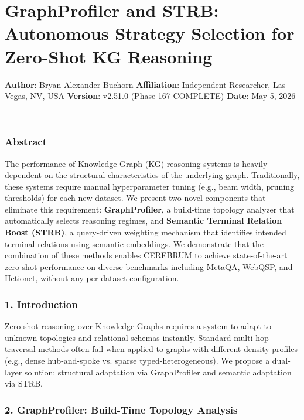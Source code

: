 \section{GraphProfiler and STRB: Autonomous Strategy Selection for Zero-Shot KG Reasoning}

\textbf{Author}: Bryan Alexander Buchorn  
\textbf{Affiliation}: Independent Researcher, Las Vegas, NV, USA  
\textbf{Version}: v2.51.0 (Phase 167 COMPLETE)
\textbf{Date}: May 5, 2026

---

\subsubsection{Abstract}

The performance of Knowledge Graph (KG) reasoning systems is heavily dependent on the structural chara\-cteristics of the underlying graph. Tradit\-ionally, these systems require manual hyper\-parameter tuning (e.g., beam width, pruning thresholds) for each new dataset. We present two novel components that eliminate this requirement: \textbf{GraphProfiler}, a build-time topology analyzer that autom\-atically selects reasoning regimes, and \textbf{Semantic Terminal Relation Boost (STRB)}, a query-driven weighting mechanism that identifies intended terminal relations using semantic embeddings. We demonstrate that the combination of these methods enables CEREBRUM to achieve state-of-the-art zero-shot performance on diverse benchmarks including MetaQA, WebQSP, and Hetionet, without any per-dataset confi\-guration.

\subsubsection{1. Introd\-uction}

Zero-shot reasoning over Knowledge Graphs requires a system to adapt to unknown topologies and relational schemas instantly. Standard multi-hop traversal methods often fail when applied to graphs with different density profiles (e.g., dense hub-and-spoke vs. sparse typed-heter\-ogeneous). We propose a dual-layer solution: structural adaptation via GraphProfiler and semantic adaptation via STRB.

\subsubsection{2. GraphProfiler: Build-Time Topology Analysis}

